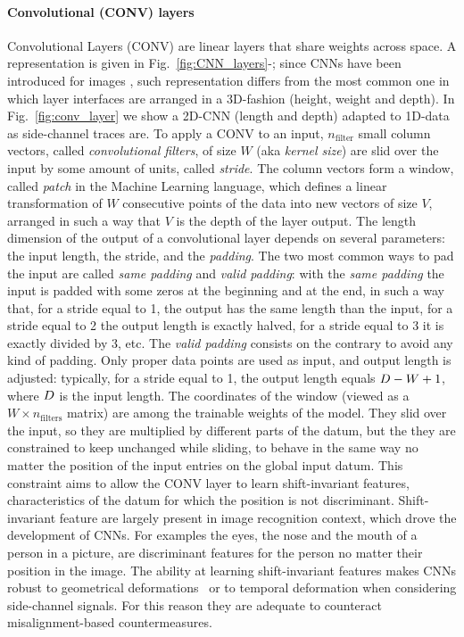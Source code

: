 \paragraph*{Convolutional (CONV) layers} 
Convolutional Layers (CONV) are linear layers that share weights across space. A representation is given in Fig.~\ref{fig:CNN_layers}-; since CNNs have been introduced for images \cite{lecun1995convolutional}, such representation differs from the most common one in which layer interfaces are arranged in a 3D-fashion (height, weight and depth). In Fig.~\ref{fig:conv_layer} we show a 2D-CNN (length and depth) adapted to 1D-data as side-channel traces are. To apply a CONV to an input,
$n_{\text{filter}}$ small column vectors, called \emph{convolutional filters}, of
size $W$ (aka \emph{kernel size}) are slid over 
the input by some amount of units, called \emph{stride}. 
The column vectors form a
window, called \emph{patch} in the Machine Learning language, which defines a
linear transformation of $W$ consecutive points of the data into new
vectors of size $V$, arranged in such a way that $V$ is the depth of the layer output. The length dimension of the output of a convolutional layer depends on several parameters: the input length, the stride, and the \emph{padding}. The two most common ways to pad the input are called \emph{same padding} and \emph{valid padding}: with the \emph{same padding} the input is padded with some zeros at the beginning and at the end, in such a way that, for a stride equal to 1, the output has the same
length than the input, for a stride equal to 2 the output length is exactly halved, for a stride equal to 3 it is exactly divided by 3, etc.  The \emph{valid padding} consists on the contrary to avoid any kind of padding. Only proper data points are used as input, and output length is adjusted: typically, for a stride equal to 1, the output length equals $D - W +1$, where $D$ is the input length. The
coordinates of the window (viewed as a $W\times n_{\text{filters}}$ matrix) are among the trainable weights of the model. They slid over the input, so they are multiplied by different parts of the datum, but the they are constrained to keep unchanged while sliding, \ie to behave in the same way no matter the position of the input entries on the global input datum. This constraint aims to allow the CONV layer to
learn shift-invariant features, \ie characteristics of the datum for which the position is not discriminant. Shift-invariant feature are largely present in image recognition context, which drove the development of CNNs. For examples the eyes, the nose and the mouth of a person in a picture, are discriminant features for the person no matter their position in the image. The ability at learning shift-invariant features makes CNNs robust to
geometrical deformations~\cite{lecun1995convolutional} or to temporal deformation when considering side-channel signals. For this reason they are adequate to counteract misalignment-based countermeasures.


